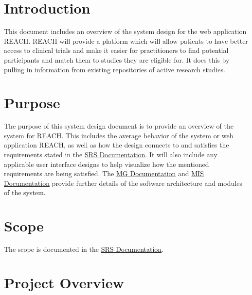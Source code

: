 \documentclass[12pt, titlepage]{article}
\begin{document}
\newpage

\tableofcontents

\newpage

\listoftables

\listoffigures

\newpage


\section{Introduction}

This document includes an overview of the system design for the web application REACH. 
REACH will provide a platform which will allow patients to have better access to clinical trials and make it 
easier for practitioners to find potential participants and match them to studies they are eligible for. 
It does this by pulling in information from existing repositories of active research studies.

\section{Purpose}

The purpose of this system design document is to provide an overview of the system for REACH. This includes the 
average behavior of the system or web application REACH, as well as how the design connects to and satisfies the 
requirements stated in the \href{https://github.com/davimang/REACH/blob/main/docs/SRS/SRS.pdf}{SRS Documentation}. 
It will also include any applicable user interface designs to help visualize how the mentioned requirements are 
being satisfied. The \href{https://github.com/davimang/REACH/blob/main/docs/Design/SoftArchitecture/MG.pdf}{MG Documentation} 
and \href{https://github.com/davimang/REACH/blob/design_docs/docs/Design/SoftDetailedDes/MIS.pdf}{MIS Documentation} 
provide further details of the software architecture and modules of the system.

\section{Scope}

The scope is documented in the \href{https://github.com/davimang/REACH/blob/main/docs/SRS/SRS.pdf}{SRS Documentation}.

\section{Project Overview}
\end{document}
